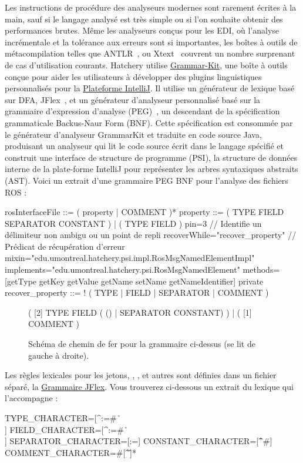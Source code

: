 {Les instructions de procédure des analyseurs modernes sont rarement écrites à la main, sauf si le langage analysé est très simple ou si l'on souhaite obtenir des performances brutes. Même les analyseurs conçus pour les EDI, où l'analyse incrémentale et la tolérance aux erreurs sont si importantes, les boîtes à outils de métacompilation telles que ANTLR~\citep{parr1995antlr}, ou Xtext~\citep{eysholdt2010xtext} couvrent un nombre surprenant de cas d'utilisation courants. Hatchery utilise \href{https://github.com/JetBrains/grammar-kit}{Grammar-Kit}, une boîte à outils conçue pour aider les utilisateurs à développer des plugins linguistiques personnalisés pour la \href{https://www.jetbrains.org/intellij/sdk/docs}{Plateforme IntelliJ}. Il utilise un générateur de lexique basé sur DFA, JFlex~\citep{klein2001jflex}, et un générateur d'analyseur personnalisé basé sur la grammaire d'expression d'analyse (PEG)~\citep{ford2004parsing}, un descendant de la spécification grammaticale Backus-Naur Form (BNF). Cette spécification est consommée par le générateur d'analyseur GrammarKit et traduite en code source Java, produisant un analyseur qui lit le code source écrit dans le langage spécifié et construit une interface de structure de programme (PSI), la structure de données interne de la plate-forme IntelliJ pour représenter les arbres syntaxiques abstraits (AST). Voici un extrait d'une grammaire PEG BNF pour l'analyse des fichiers ROS \href{https://wiki.ros.org/msg}{} :
%
\begin{bnflisting}
rosInterfaceFile ::= ( property | COMMENT )*
property ::= ( TYPE FIELD SEPARATOR CONSTANT ) | ( TYPE FIELD ) {
    pin=3 // Identifie un délimiteur non ambigu ou un point de repli
    recoverWhile="recover_property" // Prédicat de récupération d'erreur
    mixin="edu.umontreal.hatchery.psi.impl.RosMsgNamedElementImpl"
    implements="edu.umontreal.hatchery.psi.RosMsgNamedElement"
    methods=[getType getKey getValue getName setName getNameIdentifier]
}
private recover_property ::= ! ( TYPE | FIELD | SEPARATOR | COMMENT )
\end{bnflisting}
%
\begin{figure}
\centering
\begin{rail}
( [2] TYPE FIELD ( () | SEPARATOR CONSTANT) ) | ( [1] COMMENT )
\end{rail}
\caption{Schéma de chemin de fer pour la grammaire ci-dessus (se lit de gauche à droite).}
\label{fig:railroad}
\end{figure}
%
Les règles lexicales pour les jetons, , ,  et autres sont définies dans un fichier  séparé, la \href{https://www.jflex.de/manual.html#Grammar}{Grammaire JFlex}. Vous trouverez ci-dessous un extrait du lexique  qui l'accompagne :
%
\begin{flexlisting}
TYPE_CHARACTER=[^:=#\ \r\n\t\f\\]
FIELD_CHARACTER=[^:=#\ \r\n\t\f\\]
SEPARATOR_CHARACTER=[:=]
CONSTANT_CHARACTER=[^\r\n\f#]
COMMENT_CHARACTER=#[^\r\n\f]*
\end{flexlisting}

}
